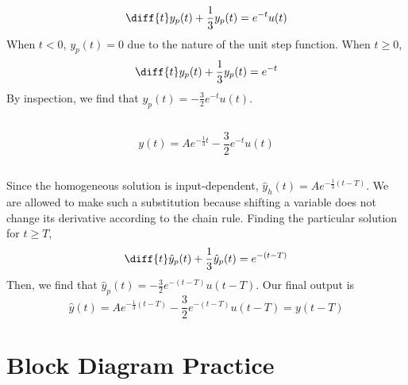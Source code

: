 \documentclass{article}
\begin{document}
\subsection{}

\begin{equation}
    \diff{t} y_p(t) + \frac{1}{3} y_p(t) = e^{-t} u(t)
\end{equation}
When \(t < 0\), \(y_p(t) = 0\) due to the nature of the unit step function.
When \(t \geqslant 0\),
\begin{equation}
    \diff{t} y_p(t) + \frac{1}{3} y_p(t) = e^{-t}
\end{equation}
By inspection, we find that \(y_p(t) = -\frac{3}{2} e^{-t} u(t)\).

\subsection{}

\begin{equation}
    y(t) = A e^{-\frac{1}{3}t} - \frac{3}{2} e^{-t} u(t)
\end{equation}

\subsection{}

Since the homogeneous solution is input-dependent, \(\hat{y}_h(t) = A e^{-\frac{1}{3} (t - T)}\).
We are allowed to make such a substitution because shifting a variable does not change its derivative according to the chain rule.
Finding the particular solution for \(t \geqslant T\),
\begin{equation}
    \diff{t} \hat{y}_p(t) + \frac{1}{3} \hat{y}_p(t) = e^{-(t - T)}
\end{equation}
Then, we find that \(\hat{y}_p(t) = -\frac{3}{2} e^{-(t - T)} u(t - T)\).
Our final output is
\begin{equation}
    \hat{y}(t) = A e^{-\frac{1}{3}(t - T)} - \frac{3}{2} e^{-(t - T)} u(t - T) = y(t - T)
\end{equation}

\section{Block Diagram Practice}

\subsection{}
\end{document}
